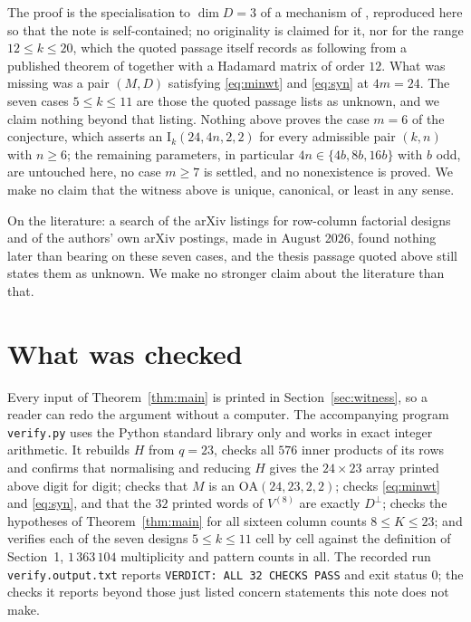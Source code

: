 \documentclass[11pt]{amsart}
\newcommand{\Idesign}{\mathrm{I}}
\newcommand{\OA}{\mathrm{OA}}
\begin{document}
The proof is the specialisation to $\dim D=3$ of a mechanism of \cite{RC2023}, reproduced here so
that the note is self-contained; no originality is claimed for it, nor for the range
$12\le k\le20$, which the quoted passage itself records as following from a published theorem of
\cite{RC2023} together with a Hadamard matrix of order $12$. What was missing was a pair $(M,D)$
satisfying \eqref{eq:minwt} and \eqref{eq:syn} at $4m=24$. The seven cases $5\le k\le11$ are
those the quoted passage lists as unknown, and we claim nothing beyond that listing. Nothing above
proves the case $m=6$ of the conjecture, which asserts an $\Idesign_k(24,4n,2,2)$ for every
admissible pair $(k,n)$ with $n\ge6$; the remaining parameters, in particular
$4n\in\{4b,8b,16b\}$ with $b$ odd, are untouched here, no case $m\ge7$ is settled, and no
nonexistence is proved. We make no claim that the witness above is unique, canonical, or least in
any sense.

On the literature: a search of the arXiv listings for row-column factorial designs and of the
authors' own arXiv postings, made in August 2026, found nothing later than \cite{RC2023} bearing on
these seven cases, and the thesis passage quoted above still states them as unknown. We make no
stronger claim about the literature than that.

\section{What was checked}

Every input of Theorem~\ref{thm:main} is printed in Section~\ref{sec:witness}, so a reader can redo
the argument without a computer. The accompanying program \texttt{verify.py} uses the Python
standard library only and works in exact integer arithmetic. It rebuilds $H$ from $q=23$, checks
all $576$ inner products of its rows and confirms that normalising and reducing $H$ gives the
$24\times23$ array printed above digit for digit; checks that $M$ is an $\OA(24,23,2,2)$; checks
\eqref{eq:minwt} and \eqref{eq:syn}, and that the $32$ printed words of $V^{(8)}$ are exactly
$D^{\perp}$; checks the hypotheses of Theorem~\ref{thm:main} for all sixteen column counts
$8\le K\le23$; and verifies each of the seven designs $5\le k\le11$ cell by cell against the
definition of Section~1, $1\,363\,104$ multiplicity and pattern counts in all. The recorded run
\texttt{verify.output.txt} reports \texttt{VERDICT: ALL 32 CHECKS PASS} and exit status $0$; the
checks it reports beyond those just listed concern statements this note does not make.
\end{document}
